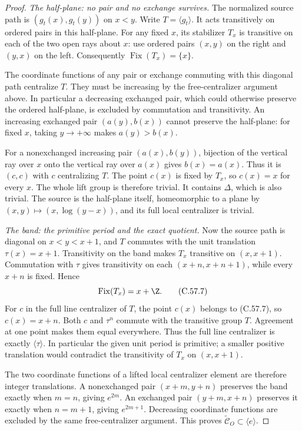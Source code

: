 \begin{proof}
\emph{The half-plane: no pair and no exchange survives.}
The normalized source path is
$(g_t(x),g_t(y))$ on $x<y$.
Write $T=\langle g_t\rangle$.
It acts transitively on ordered pairs
in this half-plane.
For any fixed $x$, its stabilizer
$T_x$ is transitive on each of
the two open rays about $x$:
use ordered pairs $(x,y)$ on the
right and $(y,x)$ on the left.
Consequently
$\operatorname{Fix}(T_x)=\{x\}$.

The coordinate functions of any
pair or exchange commuting with
this diagonal path centralize $T$.
They must be increasing by the
free-centralizer argument above.
In particular a decreasing exchanged
pair, which could otherwise preserve
the ordered half-plane, is excluded
by commutation and transitivity.
An increasing exchanged pair
$(a(y),b(x))$ cannot preserve the
half-plane: for fixed $x$, taking
$y\to+\infty$ makes $a(y)>b(x)$.

For a nonexchanged increasing pair
$(a(x),b(y))$, bijection of the
vertical ray over $x$ onto the
vertical ray over $a(x)$ gives
$b(x)=a(x)$.
Thus it is $(c,c)$ with $c$ centralizing
$T$. The point $c(x)$ is fixed by
$T_x$, so $c(x)=x$ for every $x$.
The whole lift group is therefore
trivial. It contains $\Delta$,
which is also trivial.
The source is the half-plane itself,
homeomorphic to a plane by
$(x,y)\mapsto(x,\log(y-x))$, and
its full local centralizer is trivial.

\emph{The band: the primitive period and the exact quotient.}
Now the source path is diagonal
on $x<y<x+1$, and $T$ commutes with
the unit translation $\tau(x)=x+1$.
Transitivity on the band makes
$T_x$ transitive on $(x,x+1)$.
Commutation with $\tau$ gives
transitivity on each
$(x+n,x+n+1)$, while every $x+n$
is fixed. Hence
\[
                         \operatorname{Fix}(T_x)=x+\Z.
                                                               \tag{C.57.7}
\]
For $c$ in the full line centralizer
of $T$, the point $c(x)$ belongs
to (C.57.7), so $c(x)=x+n$.
Both $c$ and $\tau^n$ commute with
the transitive group $T$.
Agreement at one point makes them
equal everywhere. Thus the full
line centralizer is exactly
$\langle\tau\rangle$.
In particular the given unit period
is primitive; a smaller positive
translation would contradict the
transitivity of $T_x$ on $(x,x+1)$.

The two coordinate functions of a
lifted local centralizer element
are therefore integer translations.
A nonexchanged pair
$(x+m,y+n)$ preserves the band
exactly when $m=n$, giving $e^{2m}$.
An exchanged pair
$(y+m,x+n)$ preserves it exactly
when $n=m+1$, giving $e^{2m+1}$.
Decreasing coordinate functions
are excluded by the same
free-centralizer argument.
This proves
$\widetilde{\mathcal C}_O\subset\langle e\rangle$.


\end{proof}
